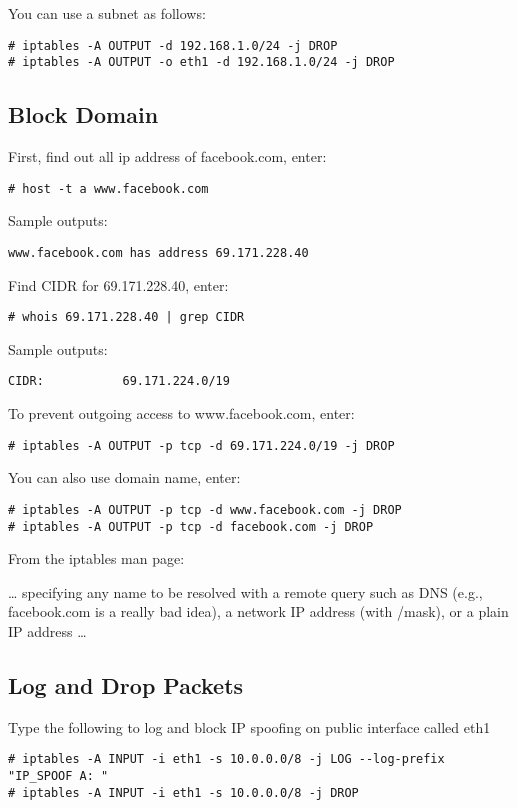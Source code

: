 \documentclass[dvipdfm]{book}
\begin{document}
You can use a subnet as follows:
\begin{verbatim}
# iptables -A OUTPUT -d 192.168.1.0/24 -j DROP
# iptables -A OUTPUT -o eth1 -d 192.168.1.0/24 -j DROP
\end{verbatim}

\subsection{Block Domain}

First, find out all ip address of facebook.com, enter:
\begin{verbatim}
# host -t a www.facebook.com
\end{verbatim}

Sample outputs:
\begin{verbatim}
www.facebook.com has address 69.171.228.40
\end{verbatim}

Find CIDR for 69.171.228.40, enter:
\begin{verbatim}
# whois 69.171.228.40 | grep CIDR
\end{verbatim}

Sample outputs:
\begin{verbatim}
CIDR:           69.171.224.0/19
\end{verbatim}

To prevent outgoing access to www.facebook.com, enter:
\begin{verbatim}
# iptables -A OUTPUT -p tcp -d 69.171.224.0/19 -j DROP
\end{verbatim}

You can also use domain name, enter:
\begin{verbatim}
# iptables -A OUTPUT -p tcp -d www.facebook.com -j DROP
# iptables -A OUTPUT -p tcp -d facebook.com -j DROP
\end{verbatim}

From the iptables man page:

… specifying any name to be resolved with a remote query such as DNS
(e.g., facebook.com is a really bad idea), a network IP address (with
/mask), or a plain IP address …

\subsection{Log and Drop Packets}

Type the following to log and block IP spoofing on public interface called eth1
\begin{verbatim}
# iptables -A INPUT -i eth1 -s 10.0.0.0/8 -j LOG --log-prefix "IP_SPOOF A: "
# iptables -A INPUT -i eth1 -s 10.0.0.0/8 -j DROP
\end{verbatim}
\end{document}
